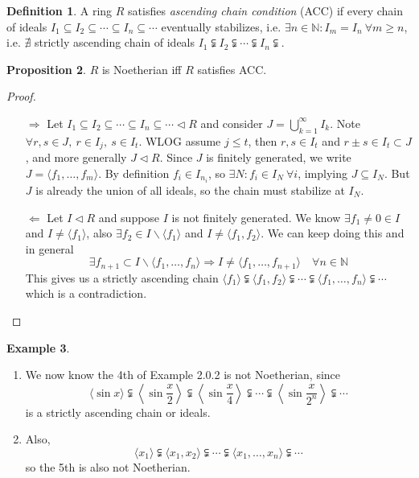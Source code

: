 \documentclass[a4paper]{article}
\theoremstyle{definition}
\newtheorem{defn}{Definition}[subsection]
\newtheorem{prop}[defn]{Proposition}
\newtheorem{example}[defn]{Example}
\begin{document}
\begin{defn}
A ring $R$ satisfies \textit{ascending chain condition} (ACC) if every chain of ideals $I_1\subseteq I_2\subseteq \cdots \subseteq I_n\subseteq \cdots$ eventually stabilizes, i.e. $\exists n\in\mathbb N:I_m=I_n \ \forall m\geq n$, i.e. $\nexists$ strictly ascending chain of ideals $I_1\subsetneqq I_2\subsetneqq \cdots \subsetneqq I_n \subsetneqq$.
\end{defn}
\begin{prop}
$R$ is Noetherian iff $R$ satisfies ACC.
\end{prop}
\begin{proof}
\begin{itemize}
\item[$\Rightarrow$] Let $I_1\subseteq I_2\subseteq \cdots \subseteq I_n\subseteq \cdots \lhd R$ and consider $J=\bigcup_{k=1}^\infty I_k$. Note $\forall r,s\in J,\ r\in I_j,\ s\in I_t$. WLOG assume $j\leq t$, then $r,s\in I_t$ and $r\pm s\in I_t\subset J$, and more generally $J\lhd R$. Since $J$ is finitely generated, we write $J=\langle f_1,\ldots,f_m\rangle$. By definition $f_i\in I_{n_i}$, so $\exists N:f_i\in I_N \ \forall i$, implying $J\subseteq I_N$. But $J$ is already the union of all ideals, so the chain must stabilize at $I_N$.

\item[$\Leftarrow$] Let $I\lhd R$ and suppose $I$ is not finitely generated. We know $\exists f_1\neq 0\in I$ and $I\neq \langle f_1\rangle$, also $\exists f_2\in I\backslash \langle f_1\rangle$ and $I\neq \langle f_1,f_2\rangle$. We can keep doing this and in general
\[
\exists f_{n+1}\subset I\backslash \langle f_1,\ldots,f_n\rangle \Rightarrow I\neq \langle f_1,\ldots,f_{n+1}\rangle \quad \forall n\in \mathbb N
\]
This gives us a strictly ascending chain $\langle f_1\rangle \subsetneqq \langle f_1,f_2\rangle \subsetneqq \cdots \subsetneqq \langle f_1,\ldots,f_n\rangle \subsetneqq \cdots$ which is a contradiction.
\end{itemize}
\end{proof}
\begin{example}
\begin{enumerate}
\item We now know the 4th of Example 2.0.2 is not Noetherian, since
\[
\langle \sin x\rangle \subsetneqq \left\langle \sin \frac{x}{2}\right\rangle \subsetneqq \left\langle \sin \frac{x}{4}\right\rangle \subsetneqq \cdots \subsetneqq \left\langle \sin \frac{x}{2^n}\right\rangle \subsetneqq \cdots
\]
is a strictly ascending chain or ideals.
\item Also,
\[
\langle x_1\rangle \subsetneqq \langle x_1,x_2\rangle \subsetneqq \cdots\subsetneqq \langle x_1,\ldots,x_n\rangle \subsetneqq \cdots
\]
so the 5th is also not Noetherian.
\end{enumerate}
\end{example}
\end{document}
